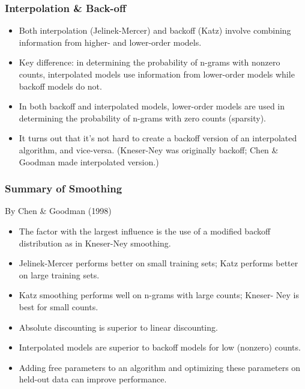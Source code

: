 \documentclass{beamer}
\begin{document}
\begin{frame}\frametitle{Interpolation \& Back-off}

\begin{itemize}
\item Both interpolation (Jelinek-Mercer) and backoff (Katz) involve combining
information from \alert{higher- and lower-order} models.
\item Key difference: in determining the probability of n-grams with \alert{nonzero}
counts, interpolated models use information from lower-order models
while backoff models do not.
\item In both backoff and interpolated models, lower-order models are
used in determining the probability of n-grams with \alert{zero counts
(sparsity)}.
\item It turns out that it's \alert{not hard} to create a backoff version of an
interpolated algorithm, and vice-versa. (Kneser-Ney was originally
backoff; Chen \& Goodman made interpolated version.)
\end{itemize}
\end{frame}


\begin{frame}\frametitle{Summary of Smoothing}
By Chen \& Goodman (1998)
\begin{itemize}
\item  The factor with the largest influence is the use of a modified backoff
distribution as in \alert{Kneser-Ney smoothing}.
\item  Jelinek-Mercer performs better on small training sets; Katz performs
better on large training sets.
\item  Katz smoothing performs well on n-grams with large counts; Kneser-
Ney is best for small counts.
\item  \alert{Absolute discounting} is superior to linear discounting.
\item  Interpolated models are superior to backoff models for low (nonzero)
counts.
\item  Adding free parameters to an algorithm and optimizing these parameters
on \alert{held-out} data can improve performance.
\end{itemize}
\end{frame}

\end{document}
